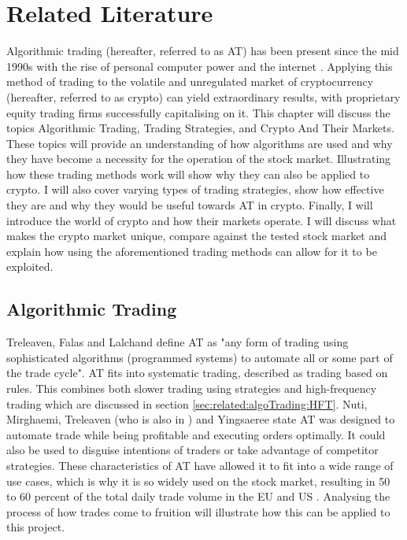 %
\chapter{Related Literature}
\label{sec:related}
Algorithmic trading (hereafter, referred to as AT) has been present since the mid 1990s with the rise of personal computer power and the internet \cite{WEB:PISANI:2010}. Applying this method of trading to the volatile and unregulated market of cryptocurrency (hereafter, referred to as crypto) can yield extraordinary results, with proprietary equity trading firms successfully capitalising on it. This chapter will discuss the topics Algorithmic Trading, Trading Strategies, and Crypto And Their Markets. These topics will provide an understanding of how algorithms are used and why they have become a necessity for the operation of the stock market. Illustrating how these trading methods work will show why they can also be applied to crypto. I will also cover varying types of trading strategies, show how effective they are and why they would be useful towards AT in crypto. Finally, I will introduce the world of crypto and how their markets operate. I will discuss what makes the crypto market unique, compare against the tested stock market and explain how using the aforementioned trading methods can allow for it to be exploited. 


\section{Algorithmic Trading}
\label{sec:related:algoTrading}
\noindent Treleaven, Falas and Lalchand \cite{ART:Treleaven:2013} define AT as "any form of trading using sophisticated algorithms (programmed systems) to automate all or some part of the trade cycle". AT fits into systematic trading, described as trading based on rules. This combines both slower trading using strategies and high-frequency trading which are discussed in section \ref{sec:related:algoTrading:HFT}. Nuti, Mirghaemi, Treleaven (who is also in \cite{ART:Treleaven:2013}) and Yingsaeree \cite{ART:Nuti:2011} state AT was designed to automate trade while being profitable and executing orders optimally. It could also be used to disguise intentions of traders or take advantage of competitor strategies. These characteristics of AT have allowed it to fit into a wide range of use cases, which is why it is so widely used on the stock market, resulting in 50 to 60 percent of the total daily trade volume in the EU and US \cite{ART:Nuti:2011}. Analysing the process of how trades come to fruition will illustrate how this can be applied to this project.

